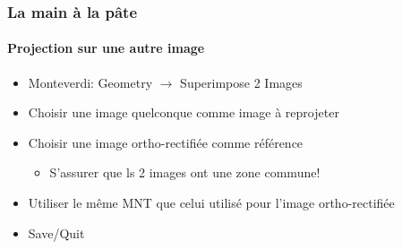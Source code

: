 \documentclass[compress]{beamer}
\begin{document}
\begin{frame}
  \frametitle{La main à la pâte}
  \framesubtitle{Projection sur une autre image}
  \begin{itemize}
  \item Monteverdi: Geometry $\rightarrow$ Superimpose 2 Images
  \item Choisir une image quelconque comme image à reprojeter
  \item Choisir une image ortho-rectifiée comme référence
    \begin{itemize}
    \item S'assurer que ls 2 images ont une zone commune!
    \end{itemize}
  \item Utiliser le même MNT que celui utilisé pour l'image ortho-rectifiée
  \item Save/Quit
  \end{itemize}
\end{frame}
\end{document}
